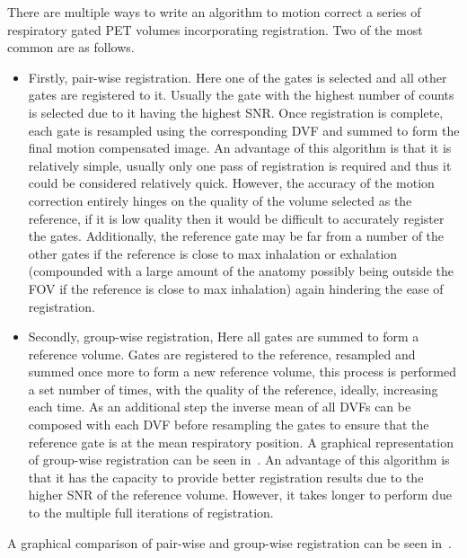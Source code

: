             There are multiple ways to write an algorithm to motion correct a series of respiratory gated \gls{PET} volumes incorporating registration. Two of the most common are as follows.
            
            \begin{itemize}
                \item Firstly, pair-wise registration. Here one of the gates is selected and all other gates are registered to it. Usually the gate with the highest number of counts is selected due to it having the highest \gls{SNR}. Once registration is complete, each gate is resampled using the corresponding \gls{DVF} and summed to form the final motion compensated image. An advantage of this algorithm is that it is relatively simple, usually only one pass of registration is required and thus it could be considered relatively quick. However, the accuracy of the motion correction entirely hinges on the quality of the volume selected as the reference, if it is low quality then it would be difficult to accurately register the gates. Additionally, the reference gate may be far from a number of the other gates if the reference is close to max inhalation or exhalation (compounded with a large amount of the anatomy possibly being outside the \gls{FOV} if the reference is close to max inhalation) again hindering the ease of registration.
                
                \item Secondly, group-wise registration, Here all gates are summed to form a reference volume. Gates are registered to the reference, resampled and summed once more to form a new reference volume, this process is performed a set number of times, with the quality of the reference, ideally, increasing each time. As an additional step the inverse mean of all \glspl{DVF} can be composed with each \gls{DVF} before resampling the gates to ensure that the reference gate is at the mean respiratory position. A graphical representation of group-wise registration can be seen in~. An advantage of this algorithm is that it has the capacity to provide better registration results due to the higher \gls{SNR} of the reference volume. However, it takes longer to perform due to the multiple full iterations of registration.
            \end{itemize}
            
            A graphical comparison of pair-wise and group-wise registration can be seen in~.
            

